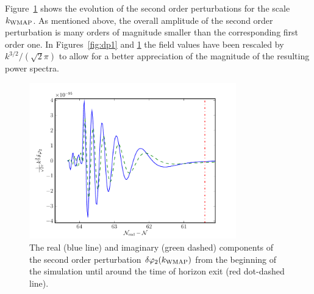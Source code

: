 Figure~\ref{fig:dp2realimag} shows the evolution of the second
order perturbations for the scale $k_\mathrm{WMAP}$. As mentioned above, the
overall amplitude of the second order perturbation is many orders of
magnitude smaller than the corresponding first order one. In Figures~\ref{fig:dp1}
and \ref{fig:dp2realimag} the field values have been rescaled by
$k^{3/2}/(\sqrt{2}\pi)$ to allow for a better appreciation of the
magnitude of the resulting power spectra.
% 
\begin{figure}[htbp]
 \centering
 \includegraphics[width=0.8\textwidth]{numerical/graphs/dp2_kwmap}
 \caption[Second Order Perturbation]{The real (blue line) and imaginary (green
dashed) components of the
second order
perturbation $\delta\varphi_{2}(k_\mathrm{WMAP})$ from the beginning of the simulation until around
the time
of horizon exit (red dot-dashed line).}
\label{fig:dp2realimag}
\end{figure}
% 



